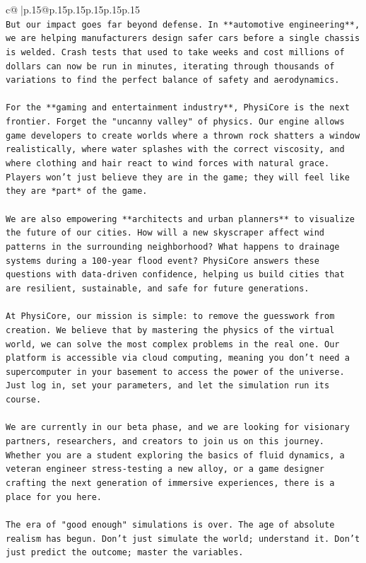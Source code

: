 \documentclass{article}
\begin{document}
{\begin{supertabular}{c@{$\;$}|p{.15\linewidth}@{}p{.15\linewidth}p{.15\linewidth}p{.15\linewidth}p{.15\linewidth}p{.15\linewidth}}
{{{\\ 
\texttt{But our impact goes far beyond defense. In **automotive engineering**, we are helping manufacturers design safer cars before a single chassis is welded. Crash tests that used to take weeks and cost millions of dollars can now be run in minutes, iterating through thousands of variations to find the perfect balance of safety and aerodynamics.} \\
\\ 
\texttt{For the **gaming and entertainment industry**, PhysiCore is the next frontier. Forget the "uncanny valley" of physics. Our engine allows game developers to create worlds where a thrown rock shatters a window realistically, where water splashes with the correct viscosity, and where clothing and hair react to wind forces with natural grace. Players won't just believe they are in the game; they will feel like they are *part* of the game.} \\
\\ 
\texttt{We are also empowering **architects and urban planners** to visualize the future of our cities. How will a new skyscraper affect wind patterns in the surrounding neighborhood? What happens to drainage systems during a 100{-}year flood event? PhysiCore answers these questions with data{-}driven confidence, helping us build cities that are resilient, sustainable, and safe for future generations.} \\
\\ 
\texttt{At PhysiCore, our mission is simple: to remove the guesswork from creation. We believe that by mastering the physics of the virtual world, we can solve the most complex problems in the real one. Our platform is accessible via cloud computing, meaning you don't need a supercomputer in your basement to access the power of the universe. Just log in, set your parameters, and let the simulation run its course.} \\
\\ 
\texttt{We are currently in our beta phase, and we are looking for visionary partners, researchers, and creators to join us on this journey. Whether you are a student exploring the basics of fluid dynamics, a veteran engineer stress{-}testing a new alloy, or a game designer crafting the next generation of immersive experiences, there is a place for you here.} \\
\\ 
\texttt{The era of "good enough" simulations is over. The age of absolute realism has begun. Don't just simulate the world; understand it. Don't just predict the outcome; master the variables.} \\
}}}
\end{supertabular}}
\end{document}
